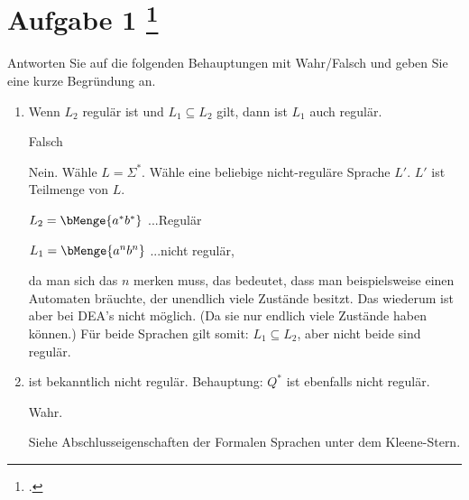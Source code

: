 \documentclass{bschlangaul-aufgabe}
\begin{document}

\let\m=\bMenge
\bAufgabenTitel{}
\section{Aufgabe 1
\footcite{examen:66115:2019:03}}

Antworten Sie auf die folgenden Behauptungen mit Wahr/Falsch und geben Sie eine kurze Begründung an.
\begin{enumerate}


\item Wenn $L_2$ regulär ist und $L_1 \subseteq L_2$ gilt, dann ist
$L_1$ auch regulär.

\begin{bAntwort}
Falsch

Nein. Wähle $L = \Sigma^*$. Wähle eine beliebige nicht-reguläre Sprache
$L'$. $L'$ ist Teilmenge von $L$.

%

$L_2 = \m{a^* b^*}$ ...Regulär

$L_1 = \m{a^n
b^n}$ ...nicht regulär,

da man sich das $n$ merken muss, das bedeutet,
dass man beispielsweise einen Automaten bräuchte, der unendlich viele
Zustände besitzt. Das wiederum ist aber bei DEA’s nicht möglich. (Da sie
nur endlich viele Zustände haben können.) Für beide Sprachen gilt somit:
$L_1 \subseteq L_2$, aber nicht beide sind regulär.
\end{bAntwort}


\item {} ist
bekanntlich nicht regulär. Behauptung: $Q^*$ ist ebenfalls nicht
regulär.

\begin{bAntwort}
Wahr.

Siehe Abschlusseigenschaften der Formalen Sprachen unter dem Kleene-Stern.
\end{bAntwort}


\end{enumerate}
\end{document}
